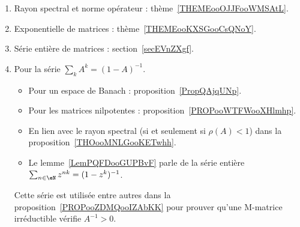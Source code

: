        \label{THEMEooPQKDooTAVKFH}

\begin{enumerate}
    \item
        Rayon spectral et norme opérateur : thème~\ref{THEMEooOJJFooWMSAtL}.
    \item
        Exponentielle de matrices : thème~\ref{THEMEooKXSGooCsQNoY}.
    \item
        Série entière de matrices : section~\ref{secEVnZXgf}.
    \item
        Pour la série \( \sum_kA^k=(1-A)^{-1}\).
        \begin{itemize}
            \item Pour un espace de Banach : proposition~\ref{PropQAjqUNp}.
            \item Pour les matrices nilpotentes : proposition~\ref{PROPooWTFWooXHlmhp}.
            \item En lien avec le rayon spectral (si et seulement si \( \rho(A)<1\)) dans la proposition~\ref{THOooMNLGooKETwhh}.
            \item Le lemme~\ref{LemPQFDooGUPBvF} parle de la série entière \( \sum_{n\in \eN}z^{nk}=(1-z^k)^{-1}\).
        \end{itemize}
        Cette série est utilisée entre autres dans la proposition~\ref{PROPooZDMQooIZAbKK} pour prouver qu'une M-matrice irréductible vérifie \( A^{-1}>0\).
\end{enumerate}
